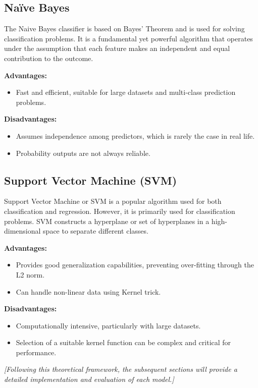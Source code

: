 \documentclass[12pt]{article}
\begin{document}
\subsection{Naïve Bayes}
The Naive Bayes classifier is based on Bayes' Theorem and is used for solving classification problems. It is a fundamental yet powerful algorithm that operates under the assumption that each feature makes an independent and equal contribution to the outcome.

\textbf{Advantages:}
\begin{itemize}
    \item Fast and efficient, suitable for large datasets and multi-class prediction problems.
\end{itemize}

\textbf{Disadvantages:}
\begin{itemize}
    \item Assumes independence among predictors, which is rarely the case in real life.
    \item Probability outputs are not always reliable.
\end{itemize}

\subsection{Support Vector Machine (SVM)}
Support Vector Machine or SVM is a popular algorithm used for both classification and regression. However, it is primarily used for classification problems. SVM constructs a hyperplane or set of hyperplanes in a high-dimensional space to separate different classes.

\textbf{Advantages:}
\begin{itemize}
    \item Provides good generalization capabilities, preventing over-fitting through the L2 norm.
    \item Can handle non-linear data using Kernel trick.
\end{itemize}

\textbf{Disadvantages:}
\begin{itemize}
    \item Computationally intensive, particularly with large datasets.
    \item Selection of a suitable kernel function can be complex and critical for performance.
\end{itemize}

\textit{[Following this theoretical framework, the subsequent sections will provide a detailed implementation and evaluation of each model.]}
\end{document}
